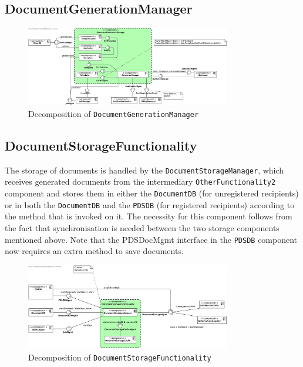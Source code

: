 \documentclass[a4paper,10pt]{article}
\begin{document}
\subsection{DocumentGenerationManager}\label{subsec:decomp-DocumentGenerationManager}
\begin{figure}[!htp]
	\centering
	\includegraphics[width=0.8\textwidth]{DocumentGenerationManager.png}
	\caption{Decomposition of \texttt{DocumentGenerationManager}}
	\label{fig:decomp-DocumentGenerationManager}
\end{figure}
\FloatBarrier

\subsection{DocumentStorageFunctionality}\label{subsec:decomp-DocumentStorageFunctionality}
The storage of documents is handled by the \texttt{DocumentStorageManager}, which receives generated documents from the intermediary \texttt{OtherFunctionality2} component and stores them in either the \texttt{DocumentDB} (for unregistered recipients) or in both the \texttt{DocumentDB} and the \texttt{PDSDB} (for registered recipients) according to the method that is invoked on it. The necessity for this component follows from the fact that synchronisation is needed between the two storage components mentioned above. Note that the PDSDocMgmt interface in the \texttt{PDSDB} component now requires an extra method to save documents.
\begin{figure}[!htp]
	\centering
	\includegraphics[width=0.8\textwidth]{DocumentStorageFunctionality.png}
	\caption{Decomposition of \texttt{DocumentStorageFunctionality}}
	\label{fig:decomp-DocumentStorageFunctionality}
\end{figure}
\FloatBarrier
\end{document}
